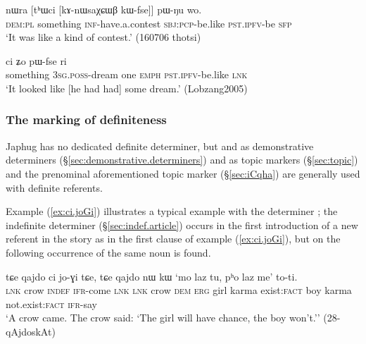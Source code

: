  \begin{exe}
\ex \label{ex:thWci.kAnWsaXCWB}
\gll nɯra [tʰɯci [kɤ-nɯsaχɕɯβ kɯ-fse]] pɯ-ŋu wo.  \\
\textsc{dem}:\textsc{pl} something \textsc{inf}-have.a.contest \textsc{sbj}:\textsc{pcp}-be.like \textsc{pst}.\textsc{ipfv}-be \textsc{sfp} \\
\glt `It was like a kind of contest.' (160706 thotsi)
 \end{exe}
 
\begin{exe}
\ex \label{ex:thWci.WjmNo}
 ci ʑo pɯ-fse ri \\
something \textsc{3sg}.\textsc{poss}-dream one \textsc{emph} \textsc{pst}.\textsc{ipfv}-be.like \textsc{lnk} \\
\glt `It looked like [he had had] some dream.' (Lobzang2005)
 \end{exe}
 
 
\subsubsection{The marking of definiteness} \label{sec:definiteness}
Japhug has no dedicated definite determiner, but   and   as demonstrative determiners (§\ref{sec:demonstrative.determiners}) and as topic markers (§\ref{sec:topic}) and the prenominal aforementioned topic marker  (§\ref{sec:iCqha}) are generally used with definite referents.  

Example (\ref{ex:ci.joGi}) illustrates a typical example with the determiner ; the indefinite determiner  (§\ref{sec:indef.article}) occurs in the first introduction of a new referent in the story as in the first clause of example (\ref{ex:ci.joGi}), but on the following occurrence of the same noun  is found.

\begin{exe}
\ex \label{ex:ci.joGi}
 \gll  tɕe qajdo ci jo-ɣi tɕe, tɕe qajdo nɯ kɯ `mo laz tu, pʰo laz me' to-ti. \\
 \textsc{lnk} crow \textsc{indef} \textsc{ifr}-come \textsc{lnk} \textsc{lnk} crow \textsc{dem} \textsc{erg} girl karma exist:\textsc{fact} boy karma not.exist:\textsc{fact} \textsc{ifr}-say \\
 \glt `A crow came. The crow said: `The girl will have  chance, the boy won't.'' (28-qAjdoskAt) 
\end{exe}

